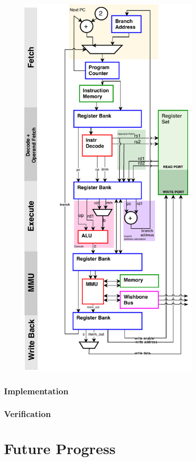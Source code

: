 \documentclass[11pt,a4paper]{report}
\begin{document}
{\begin{figure}[h]
\centering 
\includegraphics[width=9cm]{../img/risc}
\end{figure}

\subsection{Implementation}

\subsection{Verification}

\chapter{Future Progress}
{\hypersetup{linkcolor=black}
\startcontents[chapters]
}
}
\end{document}
